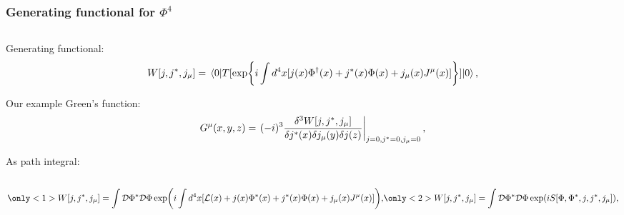 \documentclass[accentcolor=tud2c,usenames,dvipsnames,colorbacktitle,inverttitle,landscape,german,presentation,t]{tudbeamer}
\begin{document}
  \begin{frame}
    \frametitle{Generating functional for $\Phi^4$}
    \begin{columns}[c]
      \begin{column}{0.8\textwidth}
        Generating functional:
        \begin{equation*}
          W[j, j^{*}, j_{\mu}] = \mel*{0}{T[\exp{i\int d^4x[j(x) \Phi^{\dagger}(x) + j^{*}(x) \Phi(x) + j_{\mu}(x) J^{\mu}(x)]}]}{0},
        \end{equation*}

        Our example Green's function:
        \begin{equation*}
          G^{\mu}(x,y,z) = \left.(-i)^3 \frac{\delta^3 W[j, j^{*}, j_{\mu}]}{\delta j^{*}(x) \delta j_{\mu}(y) \delta j(z)}\right\rvert_{j=0,j^{*}=0,j_{\mu}=0},
        \end{equation*}

        As path integral:
      \end{column}
    \end{columns}

    \begin{equation*}
      \only<1>{W[j, j^{*}, j_{\mu}] = \int \mathcal{D}\Phistar \mathcal{D}\Phi \exp(i \int d^4x[\mathcal{L}(x) + j(x) \Phi^{*} (x) + j^{*}(x) \Phi(x) + j_{\mu}(x) \Jmu(x)]),}
      \only<2>{W[j, j^{*}, j_{\mu}] = \int \mathcal{D}\Phistar \mathcal{D}\Phi \exp(i S[\Phi, \Phistar, j, j^{*}, j_{\mu}]),}
    \end{equation*}
    \begin{columns}[c]
      \begin{column}{0.8\textwidth}
      \end{column}
    \end{columns}

  \end{frame}
\end{document}
